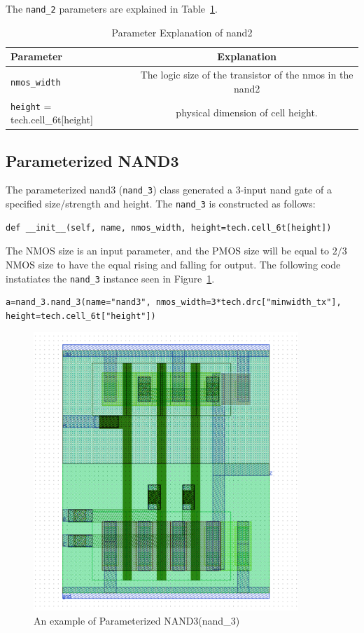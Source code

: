 The \verb|nand_2| parameters are explained in Table~\ref{table:nand2_params}.
\begin{table}[h!] 
  \begin{center}
    \begin{tabular}{| l | c |}
    \hline
    Parameter & Explanation \\ \hline
    \verb|nmos_width| & The logic size of the transistor of the nmos in the nand2 \\ \hline
    \verb|height| = tech.cell\_6t[height] & physical dimension of cell height. \\ 
    \hline
    \end{tabular}
  \end{center}
  \caption{Parameter Explanation of nand2}
  \label{table:nand2_params}
\end{table}



\subsection{Parameterized NAND3}
\label{sec:nand3}

The parameterized nand3 (\verb|nand_3|) class generated a 3-input nand gate
of a specified size/strength and height.  The \verb|nand_3| is
constructed as follows:
\begin{verbatim}
def __init__(self, name, nmos_width, height=tech.cell_6t[height])
\end{verbatim}
The NMOS size is an input parameter, and the PMOS size
will be equal to $2/3$ NMOS size to have the equal rising and falling for output.
The following code instatiates the \verb|nand_3| instance seen in Figure~\ref{fig:nand3}.
\begin{verbatim}
a=nand_3.nand_3(name="nand3", nmos_width=3*tech.drc["minwidth_tx"], 
height=tech.cell_6t["height"])
\end{verbatim}


\begin{figure}[h!]
\centering
\includegraphics[width=10cm]{./figs/nand3.pdf}
\caption{An example of Parameterized NAND3(nand\_3)}
\label{fig:nand3}
\end{figure}

